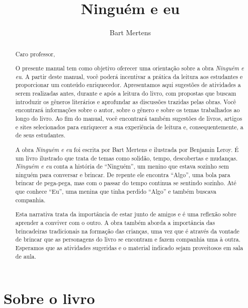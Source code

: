 \documentclass[11pt]{extarticle}
\newcommand{\AutorLivro}{Bart Mertens}
\newcommand{\TituloLivro}{Ninguém e eu}
\newcommand{\colaborador}{Ana Lancman}
\begin{document}
\title{\TituloLivro}
\author{\AutorLivro}
\def\authornotes{\colaborador}

\date{}
\maketitle


\tableofcontents
\pagebreak

\begin{abstract}

Caro professor,\medskip

O presente manual tem como objetivo oferecer uma orientação sobre a obra \textit{Ninguém e eu}. A partir deste manual, você poderá incentivar a prática da leitura aos estudantes e proporcionar um conteúdo enriquecedor. Apresentamos aqui sugestões de atividades a serem realizadas antes, durante e após a leitura do livro, com propostas que buscam introduzir os gêneros literários e aprofundar as discussões trazidas pelas obras. Você encontrará informações sobre o autor, sobre o gênero e sobre os temas trabalhados ao longo do livro. Ao fim do manual, você encontrará também sugestões de livros, artigos e sites selecionados para enriquecer a sua experiência de leitura e, consequentemente, a de seus estudantes.

A obra \textit{Ninguém e eu} foi escrita por Bart Mertens e ilustrada por Benjamin Leroy. É um livro ilustrado que trata de temas como solidão, tempo, descobertas e mudanças. \textit{Ninguém e eu} conta a história de ``Ninguém'', um menino que estava sozinho sem ninguém para conversar e brincar. De repente ele encontra ``Algo'', uma bola para brincar de pega-pega, mas com o passar do tempo continua se sentindo sozinho. Até que conhece ``Eu'', uma menina que tinha perdido ``Algo'' e também buscava companhia.

Esta narrativa trata da importância de estar junto de amigos e é uma reflexão sobre aprender a conviver com o outro. 
A obra também aborda a importância das brincadeiras tradicionais na formação das crianças, uma vez que é através da vontade de brincar que as personagens do livro se encontram e fazem companhia uma à outra. Esperamos que as atividades sugeridas e o material indicado sejam proveitosos em sala de aula. 

\end{abstract}

\section{Sobre o livro}
\end{document}
